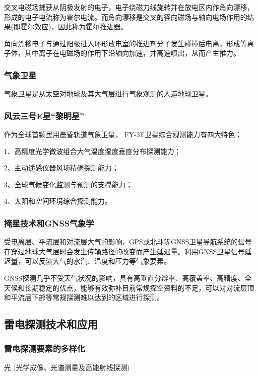 \documentclass[12pt,a4paper]{article}
\begin{document}
	交叉电磁场捕获从阴极发射的电子，电子绕磁力线旋转并在放电区内作角向漂移，形成的电子电流称为霍尔电流。而角向漂移是交叉的径向磁场与轴向电场作用的结果(即霍尔效应)，因此称为霍尔推进器。
	
	角向漂移电子与通过阳极进入环形放电室的推进剂分子发生碰撞后电离，形成等离子体，其中离子在电磁场的作用下沿轴向加速，并高速喷出，从而产生推力。
	
	\subsubsection{气象卫星}
	
	气象卫星是从太空对地球及其大气层进行气象观测的人造地球卫星。
	
	\subsubsection{风云三号E星“黎明星”}
	
	作为全球首颗民用晨昏轨道气象卫星， FY-3E卫星综合观测能力有四大特色：
	
	1、高精度光学微波组合大气温度湿度垂直分布探测能力；
	
	2、主动遥感仪器风场精确探测能力；
	
	3、全球气候变化监测与预测的支撑能力；
	
	4、太阳和空间环境综合探测能力。
	
	\subsubsection{掩星技术和GNSS气象学}
	
	受电离层、平流层和对流层大气的影响，GPS或北斗等GNSS卫星导航系统的信号在穿过地球大气层时会发生传输路径的改变而产生延迟量。利用GNSS卫星信号延迟量，可以反演大气的水汽、温度和压力等气象要素。
	
	GNSS探测几乎不受天气状况的影响，具有高垂直分辨率、高覆盖率、高精度、全天候和长期稳定的优点，能够有效弥补目前常规探空资料的不足，可以对对流层顶和平流层下部等常规探测难以达到的区域进行探测。
	
	\subsection{雷电探测技术和应用}
	
	\subsubsection{雷电探测要素的多样化}
	光 (光学成像、光谱测量及高能射线探测)
	
\end{document}
